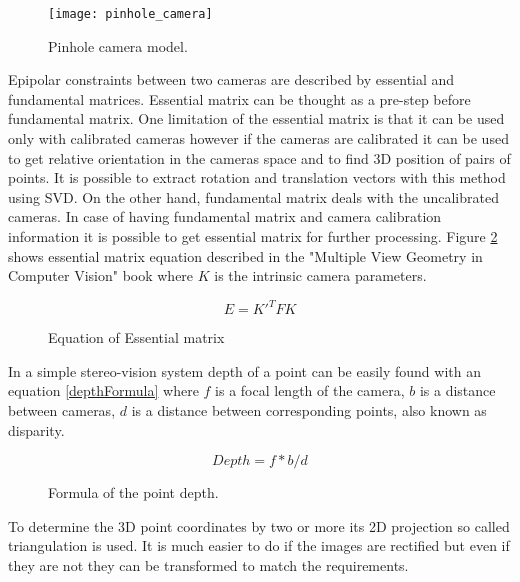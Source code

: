 \documentclass[../../../../main]{subfiles}
\begin{document}
\begin{figure} [ht]
    \begin{center}
        \texttt{[image: pinhole\_camera]}
        \caption{Pinhole camera model.}
        \label{fig:pinholeCamera}
    \end{center}
\end{figure}

Epipolar constraints between two cameras are described by essential and fundamental matrices. Essential matrix can be thought as a pre-step before fundamental matrix. One limitation of the essential matrix is that it can be used only with calibrated cameras however if the cameras are calibrated it can be used to get relative orientation in the cameras space and to find 3D position of pairs of points. It is possible to extract rotation and translation vectors with this method using \ac{SVD}. On the other hand, fundamental matrix deals with the uncalibrated cameras. In case of having fundamental matrix and camera calibration information it is possible to get essential matrix for further processing. Figure \ref{fig:essential_matrix} shows essential matrix equation described in the "Multiple View Geometry in Computer Vision" book \parencite[see][p257]{Hartley2004} where $K$ is the intrinsic camera parameters.

\begin{figure} [ht]
  \centering  
      \begin{equation}
         E = K'^TFK  
      \end{equation}
  \label{fig:essential_matrix}
  \caption{Equation of Essential matrix}
\end{figure}

In a simple stereo-vision system depth of a point can be easily found with an equation \ref{depthFormula} where $f$ is a focal length of the camera, $b$ is a distance between cameras, $d$ is a distance between corresponding points, also known as disparity.

\begin{figure} [ht]
  \centering  
      \begin{equation}
         Depth = f * b/d
         \label{depthFormula}
      \end{equation}
  \caption{Formula of the point depth.}
\end{figure}

To determine the 3D point coordinates by two or more its 2D projection so called triangulation is used. It is much easier to do if the images are rectified but even if they are not they can be transformed to match the requirements.
\end{document}
